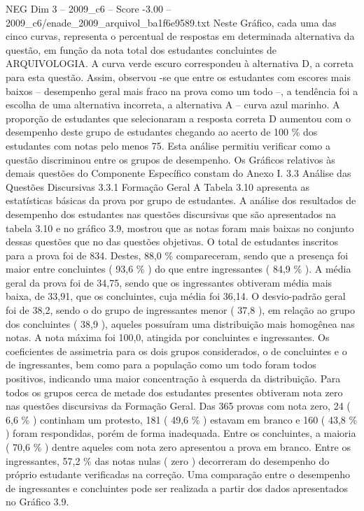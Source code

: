\begin{textsample}{NEG Dim 3 – 2009\_c6 – Score -3.00 – 2009\_c6/enade\_2009\_arquivol\_ba1f6e9589.txt}
Neste Gráfico, cada uma das cinco curvas, representa o percentual de respostas em determinada alternativa da questão, em função da nota total dos estudantes concluintes de ARQUIVOLOGIA.
A curva verde escuro correspondeu à alternativa D, a correta para esta questão.
Assim, observou -se que entre os estudantes com escores mais baixos – desempenho geral mais fraco na prova como um todo –, a tendência foi a escolha de uma alternativa incorreta, a alternativa A – curva azul marinho.
A proporção de estudantes que selecionaram a resposta correta D aumentou com o desempenho deste grupo de estudantes chegando ao acerto de 100 \% dos estudantes com notas pelo menos 75.
Esta análise permitiu verificar como a questão discriminou entre os grupos de desempenho.
Os Gráficos relativos às demais questões do Componente Específico constam do Anexo I. 3.3 Análise das Questões Discursivas 3.3.1 Formação Geral A Tabela 3.10 apresenta as estatísticas básicas da prova por grupo de estudantes.
A análise dos resultados de desempenho dos estudantes nas questões discursivas que são apresentados na tabela 3.10 e no gráfico 3.9, mostrou que as notas foram mais baixas no conjunto dessas questões que no das questões objetivas.
O total de estudantes inscritos para a prova foi de 834.
Destes, 88,0 \% compareceram, sendo que a presença foi maior entre concluintes ( 93,6 \% ) do que entre ingressantes ( 84,9 \% ).
A média geral da prova foi de 34,75, sendo que os ingressantes obtiveram média mais baixa, de 33,91, que os concluintes, cuja média foi 36,14.
O desvio-padrão geral foi de 38,2, sendo o do grupo de ingressantes menor ( 37,8 ), em relação ao grupo dos concluintes ( 38,9 ), aqueles possuíram uma distribuição mais homogênea nas notas.
A nota máxima foi 100,0, atingida por concluintes e ingressantes.
Os coeficientes de assimetria para os dois grupos considerados, o de concluintes e o de ingressantes, bem como para a população como um todo foram todos positivos, indicando uma maior concentração à esquerda da distribuição.
Para todos os grupos cerca de metade dos estudantes presentes obtiveram nota zero nas questões discursivas da Formação Geral.
Das 365 provas com nota zero, 24 ( 6,6 \% ) continham um protesto, 181 ( 49,6 \% ) estavam em branco e 160 ( 43,8 \% ) foram respondidas, porém de forma inadequada.
Entre os concluintes, a maioria ( 70,6 \% ) dentre aqueles com nota zero apresentou a prova em branco.
Entre os ingressantes, 57,2 \% das notas nulas ( zero ) decorreram do desempenho do próprio estudante verificadas na correção.
Uma comparação entre o desempenho de ingressantes e concluintes pode ser realizada a partir dos dados apresentados no Gráfico 3.9.

\end{textsample}
